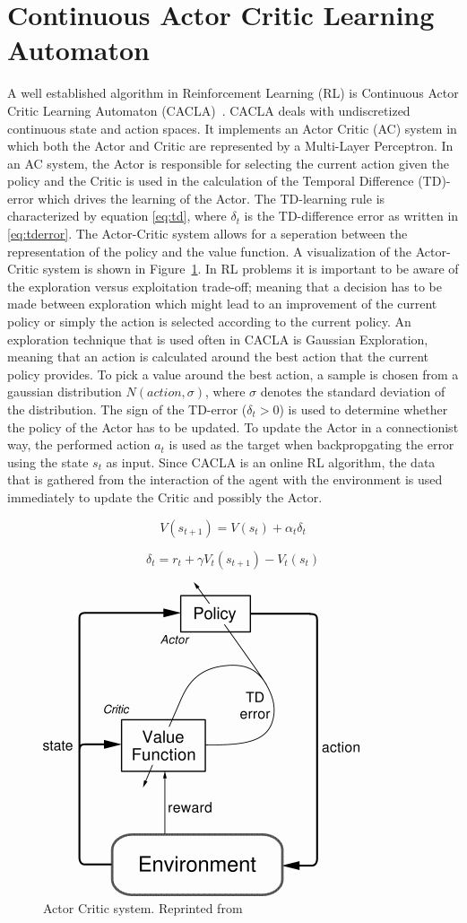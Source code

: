 
\section{Continuous Actor Critic Learning Automaton}
A well established algorithm in Reinforcement Learning (RL) is Continuous Actor Critic Learning Automaton (CACLA)~\cite{van2007reinforcement}. CACLA deals with undiscretized continuous state and action spaces. It implements an Actor Critic (AC) system in which both the Actor and Critic are represented by a Multi-Layer Perceptron. In an AC system, the Actor is responsible for selecting the current action given the policy and the Critic is used in the calculation of the Temporal Difference (TD)-error which drives the learning of the Actor. The TD-learning rule is characterized by equation \eqref{eq:td}, where $\delta_{t}$ is the TD-difference error as written in \eqref{eq:tderror}. The Actor-Critic system allows for a seperation between the representation of the policy and the value function. A visualization of the Actor-Critic system is shown in Figure~\ref{fig:actorcriticsystem}. In RL problems it is important to be aware of the exploration versus exploitation trade-off; meaning that a decision has to be made between exploration which might lead to an improvement of the current policy or simply the action is selected according to the current policy. An exploration technique that is used often in CACLA is Gaussian Exploration, meaning that an action is calculated around the best action that the current policy provides. To pick a value around the best action, a sample is chosen from a gaussian distribution $N(action, \sigma)$, where $\sigma$ denotes the standard deviation of the distribution. The sign of the TD-error ($\delta_{t} > 0$) is used to determine whether the policy of the Actor has to be updated. To update the Actor in a connectionist way, the performed action $a_{t}$ is used as the target when backpropgating the error using the state $s_{t}$ as input. Since CACLA is an online RL algorithm, the data that is gathered from the interaction of the agent with the environment is used immediately to update the Critic and possibly the Actor. 

\begin{equation}
\label{eq:td}
V(s_{t+1}) = V(s_t) + \alpha_{t} \delta_{t}
\end{equation}

\begin{equation}
\label{eq:tderror}
\delta_{t} = r_{t} + \gamma V_{t}(s_{t+1}) - V_{t}(s_{t})
\end{equation}

\begin{figure}[t]
 \centering 
    \includegraphics[width = 0.35\columnwidth]{figs/actorcritic.png}
 \caption{Actor Critic system. Reprinted from~\cite{sutton1998reinforcement}}
\label{fig:actorcriticsystem}
\end{figure}



